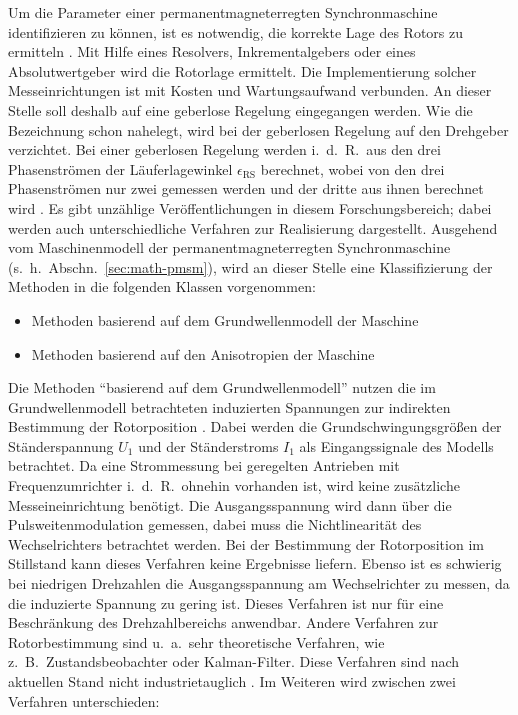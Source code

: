 \documentclass[conference,twocolumn]{IEEEtran}
\newcommand{\x}[1]{\mathrm{#1}}
\begin{document}
Um die Parameter einer permanentmagneterregten Synchronmaschine identifizieren zu können, ist es notwendig, die korrekte Lage des Rotors zu ermitteln \autocites{underwood_online_2010}{rahman_identification_2005}{piippo_adaptation_2009}.
Mit Hilfe eines Resolvers, Inkrementalgebers oder eines Absolutwertgeber wird die Rotorlage ermittelt.
Die Implementierung solcher Messeinrichtungen ist mit Kosten und Wartungsaufwand verbunden.
An dieser Stelle soll deshalb auf eine geberlose Regelung eingegangen werden.
Wie die Bezeichnung schon nahelegt, wird bei der geberlosen Regelung auf den Drehgeber verzichtet.
Bei einer geberlosen Regelung werden i.\ d.\ R.\ aus den drei Phasenströmen der Läuferlagewinkel $\epsilon_\x{RS}$ berechnet, wobei von den drei Phasenströmen nur zwei gemessen werden und der dritte aus ihnen berechnet wird \autocite{ternesfeldkamp}.
Es gibt unzählige Veröffentlichungen in diesem Forschungsbereich; dabei werden auch unterschiedliche Verfahren zur Realisierung dargestellt.
Ausgehend vom Maschinenmodell der permanentmagneterregten Synchronmaschine (s.~h.~Abschn.~\ref{sec:math-pmsm}), wird an dieser Stelle eine Klassifizierung der Methoden in die folgenden Klassen vorgenommen:

\begin{itemize}
	\item Methoden basierend auf dem Grundwellenmodell der Maschine
	\item Methoden basierend auf den Anisotropien der Maschine
\end{itemize}

Die Methoden \enquote{basierend auf dem Grundwellenmodell} nutzen die im Grundwellenmodell betrachteten induzierten Spannungen zur indirekten Bestimmung der Rotorposition \autocite{Perassi2006}.
Dabei werden die Grundschwingungsgrößen der Ständerspannung $U_\x{1}$ und der Ständerstroms $I_\x{1}$ als Eingangssignale des Modells betrachtet.
Da eine Strommessung bei geregelten Antrieben mit Frequenzumrichter i.\ d.\ R.\ ohnehin vorhanden ist, wird keine zusätzliche Messeineinrichtung benötigt.
Die Ausgangsspannung wird dann über die Pulsweitenmodulation gemessen, dabei muss die Nichtlinearität des Wechselrichters betrachtet werden.
Bei der Bestimmung der Rotorposition im Stillstand kann dieses Verfahren keine Ergebnisse liefern.
Ebenso ist es schwierig bei niedrigen Drehzahlen die Ausgangsspannung am Wechselrichter zu messen, da die induzierte Spannung zu gering ist.
Dieses Verfahren ist nur für eine Beschränkung des Drehzahlbereichs anwendbar.
Andere Verfahren zur Rotorbestimmung sind u.\ a.\ sehr theoretische Verfahren, wie z.\ B.\ Zustandsbeobachter oder Kalman-Filter.
Diese Verfahren sind nach aktuellen Stand nicht industrietauglich \autocite{Kellner2012}.
Im Weiteren wird zwischen zwei Verfahren unterschieden:
\end{document}
